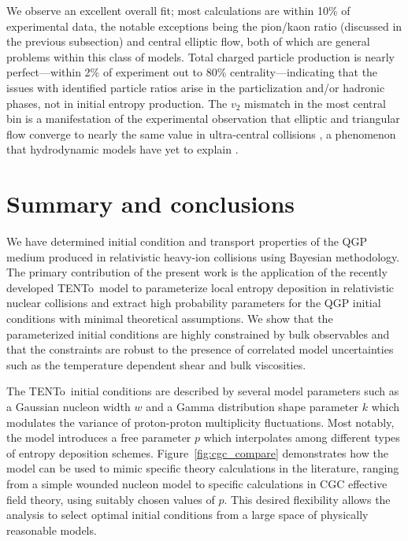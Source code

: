 \documentclass[aps,prc,reprint,amsmath,nofootinbib,superscriptaddress]{revtex4-1}
\newcommand{\trento}{T\raisebox{-0.5ex}{R}ENTo}
\begin{document}
We observe an excellent overall fit; most calculations are within 10\% of experimental data, the notable exceptions being the pion/kaon ratio (discussed in the previous subsection) and central elliptic flow, both of which are general problems within this class of models.
Total charged particle production is nearly perfect---within 2\% of experiment out to 80\% centrality---indicating that the issues with identified particle ratios arise in the particlization and/or hadronic phases, not in initial entropy production.
The $v_2$ mismatch in the most central bin is a manifestation of the experimental observation that elliptic and triangular flow converge to nearly the same value in ultra-central collisions \cite{CMS:2013bza}, a phenomenon that hydrodynamic models have yet to explain \cite{Denicol:2014ywa,Shen:2015qta}.


\section{Summary and conclusions}

We have determined initial condition and transport properties of the QGP medium produced in relativistic heavy-ion collisions using Bayesian methodology.
The primary contribution of the present work is the application of the recently developed \trento\ model to parameterize local entropy deposition in relativistic nuclear collisions and extract high probability parameters for the QGP initial conditions with minimal theoretical assumptions.
We show that the parameterized initial conditions are highly constrained by bulk observables and that the constraints are robust to the presence of correlated model uncertainties such as the temperature dependent shear and bulk viscosities.

The \trento\ initial conditions are described by several model parameters such as a Gaussian nucleon width $w$ and a Gamma distribution shape parameter $k$ which modulates the variance of proton-proton multiplicity fluctuations.
Most notably, the model introduces a free parameter $p$ which interpolates among different types of entropy deposition schemes.
Figure~\ref{fig:cgc_compare} demonstrates how the model can be used to mimic specific theory calculations in the literature, ranging from a simple wounded nucleon model to specific calculations in CGC effective field theory, using suitably chosen values of $p$.
This desired flexibility allows the analysis to select optimal initial conditions from a large space of physically reasonable models.
\end{document}
